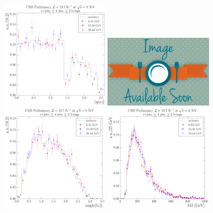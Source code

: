\begin{figure}[hbtp]
    \centering
     \includegraphics[width=0.48\textwidth]{Chapters/04_Analysis/04b_XSections/images/8TeV/fit_variables/MT/electron_absolute_eta/vjets/MT_electron_absolute_eta_2orMoreBtags_VJets_template_comparison.pdf}\hfill
     \includegraphics[width=0.48\textwidth]{Chapters/04_Analysis/04b_XSections/images/placeholder.png}\\
     \includegraphics[width=0.48\textwidth]{Chapters/04_Analysis/04b_XSections/images/8TeV/fit_variables/MT/angle_bl/vjets/MT_angle_bl_2orMoreBtags_VJets_template_comparison.pdf}\hfill
     \includegraphics[width=0.48\textwidth]{Chapters/04_Analysis/04b_XSections/images/8TeV/fit_variables/MT/M3/vjets/MT_M3_2orMoreBtags_VJets_template_comparison.pdf}\\

\end{figure}

